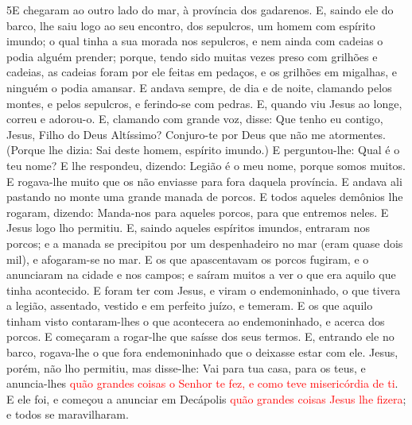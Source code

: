\lettrine{5} E chegaram ao outro lado do mar, à província dos
gadarenos. E, saindo ele do barco, lhe saiu logo ao seu
encontro, dos sepulcros, um homem com espírito imundo; o qual
tinha a sua morada nos sepulcros, e nem ainda com cadeias o podia
alguém prender; porque, tendo sido muitas vezes preso com
grilhões e cadeias, as cadeias foram por ele feitas em pedaços, e os
grilhões em migalhas, e ninguém o podia amansar. E andava
sempre, de dia e de noite, clamando pelos montes, e pelos sepulcros,
e ferindo-se com pedras. E, quando viu Jesus ao longe, correu e
adorou-o. E, clamando com grande voz, disse: Que tenho eu
contigo, Jesus, Filho do Deus Altíssimo? Conjuro-te por Deus que não
me atormentes. (Porque lhe dizia: Sai deste homem, espírito
imundo.) E perguntou-lhe: Qual é o teu nome? E lhe respondeu,
dizendo: Legião é o meu nome, porque somos muitos. E
rogava-lhe muito que os não enviasse para fora daquela província.
E andava ali pastando no monte uma grande manada de porcos.
E todos aqueles demônios lhe rogaram, dizendo: Manda-nos para
aqueles porcos, para que entremos neles. E Jesus logo lho
permitiu. E, saindo aqueles espíritos imundos, entraram nos porcos;
e a manada se precipitou por um despenhadeiro no mar (eram quase
dois mil), e afogaram-se no mar. E os que apascentavam os
porcos fugiram, e o anunciaram na cidade e nos campos; e saíram
muitos a ver o que era aquilo que tinha acontecido. E foram
ter com Jesus, e viram o endemoninhado, o que tivera a legião,
assentado, vestido e em perfeito juízo, e temeram. E os que
aquilo tinham visto contaram-lhes o que acontecera ao endemoninhado,
e acerca dos porcos. E começaram a rogar-lhe que saísse dos
seus termos. E, entrando ele no barco, rogava-lhe o que fora
endemoninhado que o deixasse estar com ele. Jesus, porém, não
lho permitiu, mas disse-lhe: Vai para tua casa, para os teus, e
anuncia-lhes \textcolor{red}{quão grandes coisas o Senhor te fez, e como
teve misericórdia de ti}. E ele foi, e começou a anunciar em
Decápolis \textcolor{red}{quão grandes coisas Jesus lhe fizera}; e todos se
maravilharam.

